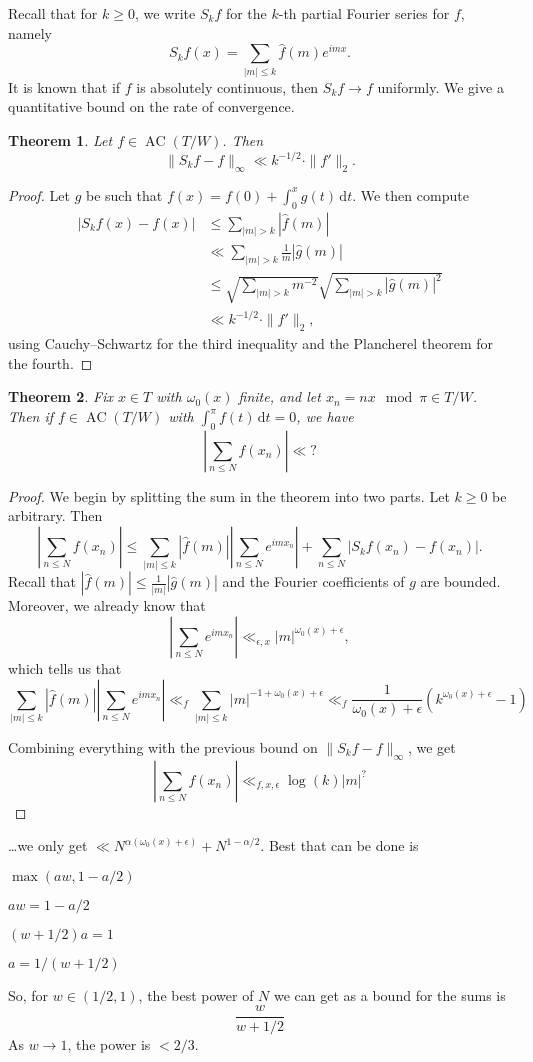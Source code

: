 \documentclass{article}
\DeclareMathOperator{\AC}{AC}
\newcommand{\dd}{\mathrm{d}}
\newtheorem{theorem}{Theorem}
\theoremstyle{definition}
\begin{document}
Recall that for $k\geqslant 0$, we write $S_k f$ for the $k$-th partial Fourier 
series for $f$, namely 
\[
	S_k f(x) = \sum_{|m|\leqslant k} \widehat f(m) e^{i m x} .
\]
It is known that if $f$ is absolutely continuous, then $S_k f\to f$ uniformly. 
We give a quantitative bound on the rate of convergence. 

\begin{theorem}
Let $f\in \AC(T/W)$. Then 
\[
	\|S_k f - f\|_\infty \ll k^{-1/2}\cdot \|f'\|_2 .
\]
\end{theorem}
\begin{proof}
Let $g$ be such that $f(x)=f(0)+\int_0^x g(t)\, \dd t$. We then compute
\begin{align*}
	|S_k f(x) - f(x)| 
		&\leqslant \sum_{|m|>k} |\widehat f(m)| \\
		&\ll \sum_{|m|>k} \frac{1}{m} |\widehat g(m)| \\
		&\leqslant \sqrt{\sum_{|m|>k} m^{-2}} \sqrt{\sum_{|m|>k} |\widehat g(m)|^2} \\
		&\ll k^{-1/2}\cdot \|f'\|_2 ,
\end{align*}
using Cauchy--Schwartz for the third inequality and the Plancherel theorem for 
the fourth.
\end{proof}

\begin{theorem}
Fix $x\in T$ with $\omega_0(x)$ finite, and let $x_n = n x\mod\pi\in T/W$. 
Then if $f\in \AC(T/W)$ with $\int_0^\pi f(t)\, \dd t=0$, we have 
\[
	\left|\sum_{n\leqslant N} f(x_n)\right| \ll ?
\]
\end{theorem}
\begin{proof}
We begin by splitting the sum in the theorem into two parts. Let $k\geqslant 0$ 
be arbitrary. Then 
\[
	\left|\sum_{n\leqslant N} f(x_n)\right| 
		\leqslant \sum_{|m|\leqslant k} |\widehat f(m)| \left| \sum_{n\leqslant N} e^{i m x_n}\right| 
		+ \sum_{n\leqslant N} |S_k f(x_n) - f(x_n)| .
\]
Recall that $|\widehat f(m)| \leqslant \frac{1}{|m|} |\widehat g(m)|$ and the 
Fourier coefficients of $g$ are bounded. Moreover, we already know that 
\[
	\left|\sum_{n\leqslant N} e^{im x_n}\right| \ll_{\epsilon,x} |m|^{\omega_0(x)+\epsilon} ,
\]
which tells us that 
\[
	\sum_{|m|\leqslant k} |\widehat f(m)| \left| \sum_{n\leqslant N} e^{i m x_n}\right|
		\ll_f \sum_{|m|\leqslant k} |m|^{-1+\omega_0(x)+\epsilon} 
		\ll_f \frac{1}{\omega_0(x)+\epsilon} (k^{\omega_0(x)+\epsilon}-1)
\]

Combining everything with the previous bound on $\|S_k f-f\|_\infty$, we get 
\[
	\left|\sum_{n\leqslant N} f(x_n)\right| \ll_{f,x,\epsilon} \log(k) |m|^?
\]
\end{proof}

\ldots we only get $\ll N^{\alpha(\omega_0(x)+\epsilon)} + N^{1-\alpha/2}$. Best that 
can be done is 

$\max(aw, 1-a/2)$

$aw=1-a/2$

$(w+1/2) a = 1$

$a=1/(w+1/2)$

So, for $w\in (1/2,1)$, the best power of $N$ we can get as a bound for the sums 
is 
\[
	\frac{w}{w+1/2}
\]
As $w\to 1$, the power is $<2/3$. 
\end{document}
